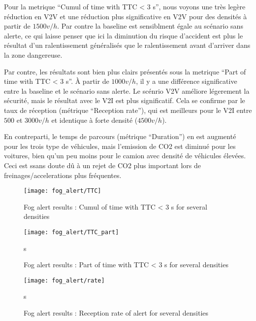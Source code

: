 \documentclass[a4paper,10pt]{report}
\begin{document}
Pour la metrique ``Cumul of time with TTC < 3 s'', nous voyons une très legère réduction en V2V et une réduction plus significative en V2V pour des densités à partir de $1500 v/h$. Par contre la baseline est sensiblment égale au scénario sans alerte, ce qui laisse penser que ici la diminution du risque d'accident est plus le résultat d'un ralentissement généralisés que le ralentissement avant d'arriver dans la zone dangereuse.

Par contre, les résultats sont bien plus clairs présentés sous la metrique ``Part of time with TTC < 3 s''. À partir de $1000 v/h$, il y a une différence significative entre la baseline et le scénario sans alerte. Le scénrio V2V améliore légerement la sécurité, mais le résultat avec le V2I est plus significatif. Cela se confirme par le taux de réception (métrique ``Reception rate''), qui est meilleurs pour le V2I entre $500$ et $3000 v/h$ et identique à forte densité ($4500 v/h$).

En contreparti, le temps de parcours (métrique ``Duration'') en est augmenté pour les trois type de véhicules, mais l'emission de CO2 est diminué pour les voitures, bien qu'un peu moins pour le camion avec densité de véhicules élevées. Ceci est ssans doute dû à un rejet de CO2 plus important lors de freinages/accelerations plus fréquentes.

\begin{figure}
    \begin{center}
         \texttt{[image: fog\_alert/TTC]}
    \end{center}
  \caption{ Fog alert results : Cumul of time with TTC < 3 s for several densities }
  \label{fig:ttc_part}
\end{figure}

\begin{figure}
    \begin{center}
         \texttt{[image: fog\_alert/TTC\_part]}
    \end{center}s
  \caption{ Fog alert results : Part of time with TTC < 3 s for several densities}
  \label{fig:ttc_part}
\end{figure}

\begin{figure}
    \begin{center}
         \texttt{[image: fog\_alert/rate]}
    \end{center}s
  \caption{ Fog alert results : Reception rate of alert for several densities}
  \label{fig:ttc_part}
\end{figure}
\end{document}
